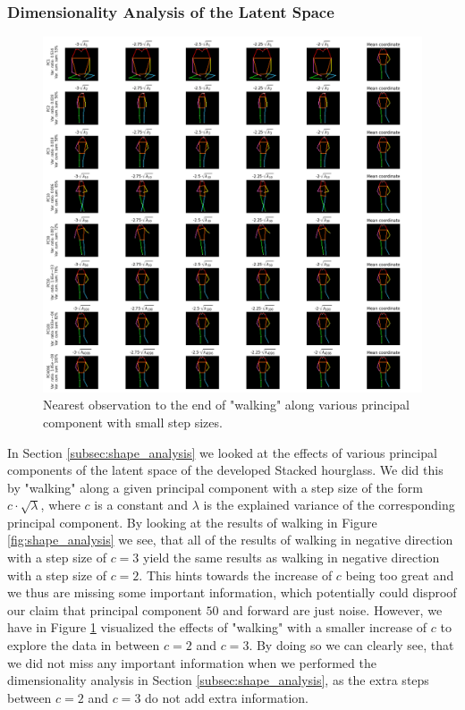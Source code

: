 \documentclass[./main.tex]{subfiles}
\begin{document}
\subsubsection{Dimensionality Analysis of the Latent Space}
\begin{figure}[htbp]
    \centering
    \includegraphics[width = \textwidth]{entities/shape_analysis_2.png}
    \caption{Nearest observation to the end of "walking" along various principal component with small step sizes.}
    \label{fig:shape_analysis_2}
\end{figure}
\noindent In Section \ref{subsec:shape_analysis} we looked at the effects of various principal components of the latent space of the developed Stacked hourglass. We did this by "walking" along a given principal component with a step size of the form $c \cdot \sqrt{\lambda}$, where $c$ is a constant and $\lambda$ is the explained variance of the corresponding principal component. By looking at the results of walking in Figure \ref{fig:shape_analysis} we see, that all of the results of walking in negative direction with a step size of $c = 3$ yield the same results as walking in negative direction with a step size of $c = 2$. This hints towards the increase of $c$ being too great and we thus are missing some important information, which potentially could disproof our claim that principal component $50$ and forward are just noise. However, we have in Figure \ref{fig:shape_analysis_2} visualized the effects of "walking" with a smaller increase of $c$ to explore the data in between $c = 2$ and $c = 3$. By doing so we can clearly see, that we did not miss any important information when we performed the dimensionality analysis in Section \ref{subsec:shape_analysis}, as the extra steps between $c = 2$ and $c = 3$ do not add extra information.
\end{document}
